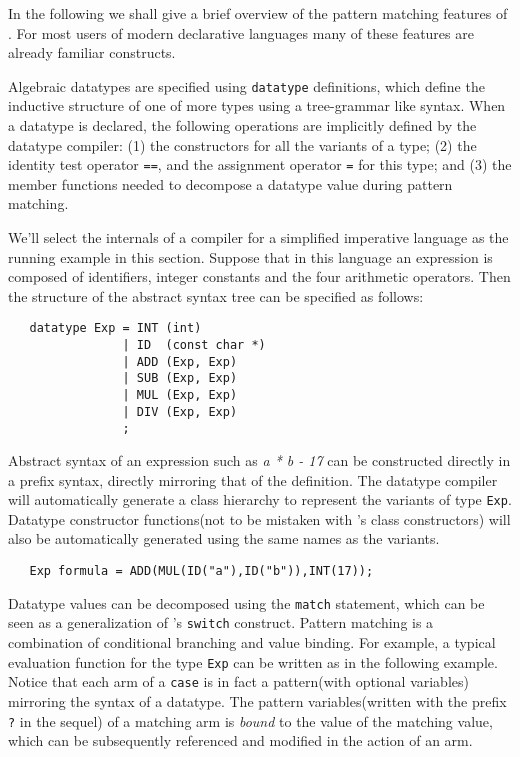 In the following we shall give a brief overview of the pattern matching
features of \Prop.  For most users of modern declarative languages many
of these features are already familiar constructs.
 
 
   Algebraic datatypes are specified using \verb|datatype| definitions,
which define the inductive structure of one of more types using
a tree-grammar like syntax.  
When a datatype is declared,
the following operations are implicitly defined by the datatype compiler:
(1) the constructors for all the variants of a type;
(2) the identity test operator \verb|==|, and the assignment
    operator \verb|=| for this type; and
(3) the member functions needed to decompose a datatype value during
    pattern matching.
 
   We'll select the internals of a compiler for a simplified imperative
language as the running example in this section.
Suppose that in this language an expression is composed of
identifiers, integer constants and the four arithmetic operators.
Then the structure of the abstract syntax tree can be specified as follows:
 
\begin{verbatim}
   datatype Exp = INT (int)
                | ID  (const char *)
                | ADD (Exp, Exp)
                | SUB (Exp, Exp)
                | MUL (Exp, Exp)
                | DIV (Exp, Exp)
                ;
\end{verbatim}

Abstract syntax of an expression such as {\em a * b - 17}
can be constructed directly in a prefix syntax, directly mirroring
that of the definition.  The \Prop{} datatype
compiler will automatically generate a \Cpp{} class hierarchy to represent
the variants of type \verb|Exp|.  Datatype constructor
functions(not to be mistaken with \Cpp's class constructors) will
also be automatically generated using the same names as the variants.
 
\begin{verbatim}
   Exp formula = ADD(MUL(ID("a"),ID("b")),INT(17));
\end{verbatim}
 
Datatype values can be decomposed using the \verb|match| statement, which
can be seen as a generalization of \C's \verb|switch| construct.  Pattern
matching is a combination of conditional branching and value
binding.  For example, a typical evaluation function for the type \verb|Exp|
can be written as in the following example.  Notice that each arm of
a \verb|case| is in fact a pattern(with optional variables)
mirroring the syntax of a datatype.  The pattern variables(written
with the prefix \verb|?| in the sequel) of a matching
arm is {\em bound} to the value of the matching value, which can be
subsequently referenced and modified in the action of an arm.
 
